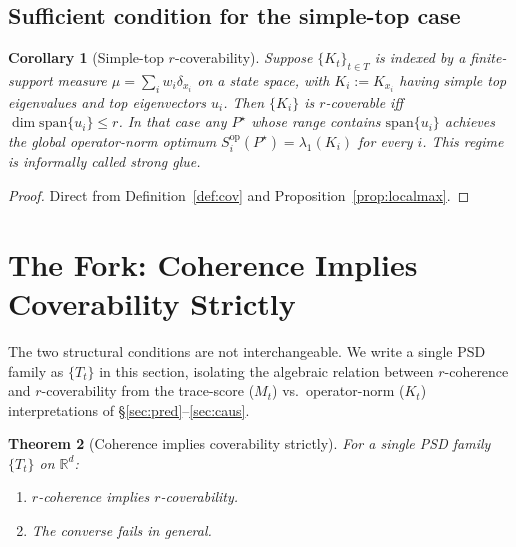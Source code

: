 \documentclass[final,3p,times]{elsarticle}
\newtheorem{theorem}{Theorem}
\newtheorem{corollary}[theorem]{Corollary}
\newcommand{\R}{\mathbb{R}}
\begin{document}
\subsection{Sufficient condition for the simple-top case}

\begin{corollary}[Simple-top $r$-coverability]\label{cor:strongglue}
Suppose $\{K_t\}_{t\in T}$ is indexed by a finite-support measure
$\mu=\sum_i w_i\delta_{x_i}$ on a state space, with $K_i:=K_{x_i}$ having
simple top eigenvalues and top eigenvectors $u_i$.
Then $\{K_i\}$ is $r$-coverable iff $\dim\mathrm{span}\{u_i\}\le r$.
In that case any $P^\star$ whose range contains $\mathrm{span}\{u_i\}$
achieves the global operator-norm optimum
$S^{\mathrm{op}}_i(P^\star)=\lambda_1(K_i)$ for every $i$.
This regime is informally called \emph{strong glue}.
\end{corollary}

\begin{proof}
Direct from Definition~\ref{def:cov} and Proposition~\ref{prop:localmax}.
\end{proof}

\section{The Fork: Coherence Implies Coverability Strictly}
\label{sec:fork}

The two structural conditions are not interchangeable.
We write a single PSD family as $\{T_t\}$ in this section, isolating the
algebraic relation between $r$-coherence and $r$-coverability from the
trace-score ($M_t$) vs.\ operator-norm ($K_t$) interpretations of
\S\ref{sec:pred}--\ref{sec:caus}.

\begin{theorem}[Coherence implies coverability strictly]\label{thm:fork}
For a single PSD family $\{T_t\}$ on $\R^d$:
\begin{enumerate}
\item[(i)] $r$-coherence implies $r$-coverability.
\item[(ii)] The converse fails in general.
\end{enumerate}
\end{theorem}
\end{document}
